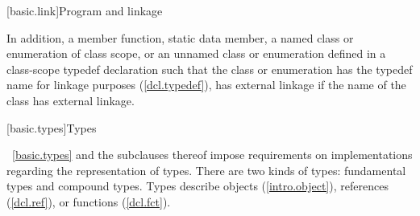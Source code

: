 \documentclass[american]{book}
\begin{document}
[basic.link]{Program and linkage}
\begin{paras}
\setcounter{Paras}{4}
\pnum
In addition, a member function, static data member, a named class or
enumeration of class scope, or an unnamed class or enumeration defined
in a class-scope typedef declaration such that the class or enumeration
has the typedef name for linkage purposes (\ref{dcl.typedef}), has external
linkage if the name of the class has external linkage.
\end{paras}

\setcounter{section}{8}
[basic.types]{Types}
\begin{paras}
\pnum
\enternote\ 
\ref{basic.types} and the subclauses thereof
impose requirements on implementations regarding the representation
of types.
There are two kinds of types: fundamental types and compound types.
Types describe objects (\ref{intro.object}),
references (\ref{dcl.ref}),
or functions (\ref{dcl.fct}).
\exitnote\ 

\end{paras}
\end{document}
